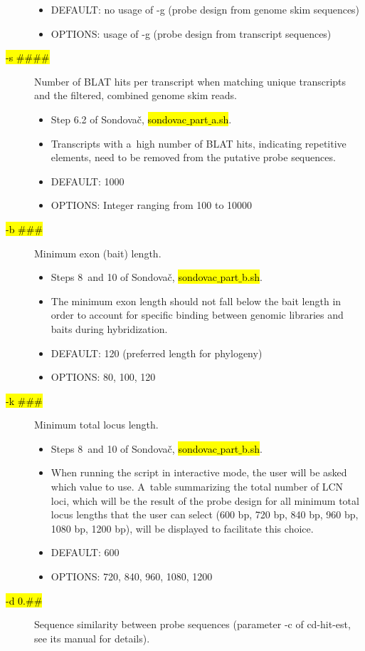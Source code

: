 \documentclass[a4paper, 11pt, twoside]{article}
\renewcommand{\texttt}[1]{\hl{\ttfamily #1}}
\begin{document}
\begin{description}
\begin{itemize}
    \item DEFAULT: no usage of -g (probe design from genome skim sequences)
    \item OPTIONS: usage of -g (probe design from transcript sequences)
  \end{itemize}
\item[\texttt{-s \#\#\#\#}] Number of BLAT hits per transcript when matching unique transcripts and the filtered, combined genome skim reads.
  \begin{itemize}
    \item Step 6.2 of Sondovač, \texttt{sondovac$\_$part$\_$a.sh}.
    \item Transcripts with a~high number of BLAT hits, indicating repetitive elements, need to be removed from the putative probe sequences.
    \item DEFAULT: 1000
    \item OPTIONS: Integer ranging from 100 to 10000
  \end{itemize}
\item[\texttt{-b \#\#\#}] Minimum exon (bait) length.
  \begin{itemize}
    \item Steps 8~and 10 of Sondovač, \texttt{sondovac$\_$part$\_$b.sh}.
    \item The minimum exon length should not fall below the bait length in order to account for specific binding between genomic libraries and baits during hybridization.
    \item DEFAULT: 120 (preferred length for phylogeny)
    \item OPTIONS: 80, 100, 120
  \end{itemize}
\item [\texttt{-k \#\#\#}] Minimum total locus length.
    \begin{itemize}
     \item Steps 8~and 10 of Sondovač, \texttt{sondovac$\_$part$\_$b.sh}.
     \item When running the script in interactive mode, the user will be asked which value to use. A~table summarizing the total number of LCN loci, which will be the result of the probe design for all minimum total locus lengths that the user can select (600 bp, 720 bp, 840 bp, 960 bp, 1080 bp, 1200 bp), will be displayed to facilitate this choice.
     \item DEFAULT: 600
     \item OPTIONS: 720, 840, 960, 1080, 1200
     \end{itemize}
\item[\texttt{-d 0.\#\#}] Sequence similarity between probe sequences (parameter -c of cd-hit-est, see its manual for details).

\end{description}
\end{document}
